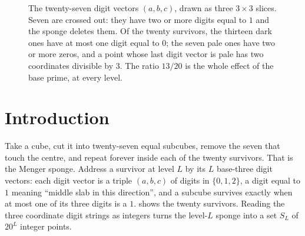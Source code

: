 \documentclass[11pt]{amsart}
\theoremstyle{definition}
\theoremstyle{remark}
\begin{document}
\begin{figure}[!ht]
\centering
{}
\caption{The twenty-seven digit vectors $(a,b,c)$, drawn as three $3\times3$ slices. Seven are crossed out: they have two or more digits equal to $1$ and the sponge deletes them. Of the twenty survivors, the thirteen dark ones have at most one digit equal to $0$; the seven pale ones have two or more zeros, and a point whose last digit vector is pale has two coordinates divisible by $3$. The ratio $13/20$ is the whole effect of the base prime, at every level.}
\label{fig:design}
\end{figure}

\section{Introduction}
\label{sec:intro}

Take a cube, cut it into twenty-seven equal subcubes, remove the seven that touch the centre, and repeat forever inside each of the twenty survivors. That is the Menger sponge. Address a survivor at level $L$ by its $L$ base-three digit vectors: each digit vector is a triple $(a,b,c)$ of digits in $\{0,1,2\}$, a digit equal to $1$ meaning ``middle slab in this direction'', and a subcube survives exactly when at most one of its three digits is a $1$.  shows the twenty survivors. Reading the three coordinate digit strings as integers turns the level-$L$ sponge into a set $S_L$ of $20^L$ integer points.
\end{document}
